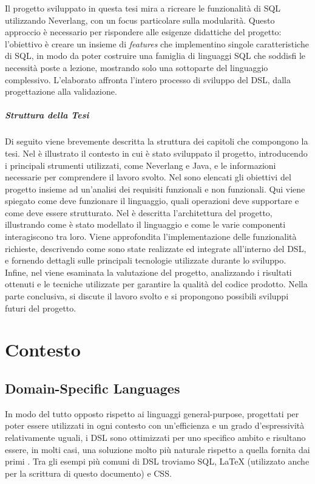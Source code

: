 \documentclass[12pt,a4paper,openright,twoside]{book}
\begin{document}
Il progetto sviluppato in questa tesi mira a ricreare le funzionalità di SQL utilizzando Neverlang, con un focus particolare sulla 
modularità. Questo approccio è necessario per rispondere alle esigenze didattiche del progetto: l’obiettivo è creare un insieme di 
\textit{features} che implementino singole caratteristiche di SQL, in modo da poter costruire una famiglia di linguaggi SQL che 
soddisfi le necessità poste a lezione, mostrando solo una sottoparte del linguaggio complessivo. L’elaborato affronta l’intero 
processo di sviluppo del DSL, dalla progettazione alla validazione.

\paragraph{Struttura della Tesi}
Di seguito viene brevemente descritta la struttura dei capitoli che compongono la tesi. Nel  è illustrato il 
contesto in cui è stato sviluppato il progetto, introducendo i principali strumenti utilizzati, come Neverlang e Java, e le informazioni 
necessarie per comprendere il lavoro svolto. Nel  sono elencati gli obiettivi del progetto insieme ad un’analisi 
dei requisiti funzionali e non funzionali. Qui viene spiegato come deve funzionare il linguaggio, quali operazioni deve supportare e 
come deve essere strutturato. Nel  è descritta l’architettura del progetto, illustrando come è stato modellato il 
linguaggio e come le varie componenti interagiscono tra loro. Viene approfondita l’implementazione delle funzionalità richieste, 
descrivendo come sono state realizzate ed integrate all’interno del DSL, e fornendo dettagli sulle principali tecnologie utilizzate 
durante lo sviluppo. Infine, nel  viene esaminata la valutazione del progetto, analizzando i risultati ottenuti 
e le tecniche utilizzate per garantire la qualità del codice prodotto. Nella parte conclusiva, si discute il lavoro svolto e si 
propongono possibili sviluppi futuri del progetto.

\chapter{Contesto}
\label{chap:contesto}

\section{Domain-Specific Languages}
In modo del tutto opposto rispetto ai linguaggi general-purpose, progettati per poter essere utilizzati in ogni contesto con un’efficienza e 
un grado d’espressività relativamente uguali, i \ac{DSL} sono ottimizzati per uno specifico ambito e risultano essere, in molti casi, una 
soluzione molto più naturale rispetto a quella fornita dai primi \cite{Hudak1997}. Tra gli esempi più comuni di \ac{DSL} troviamo SQL, LaTeX 
(utilizzato anche per la scrittura di questo documento) e CSS.
\end{document}
